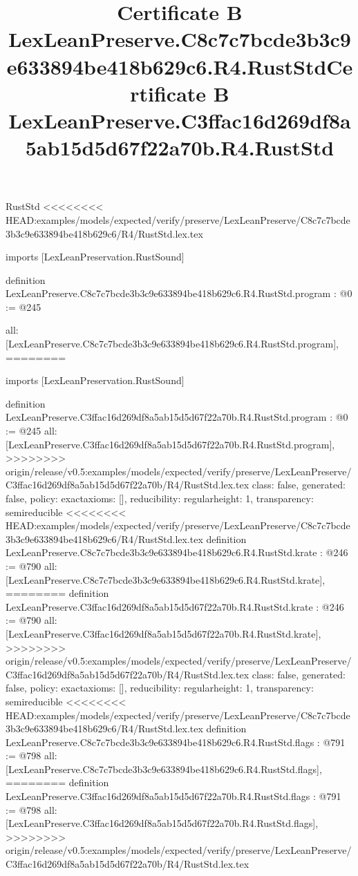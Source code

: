 \begin{lexlean}{RustStd}
<<<<<<<< HEAD:examples/models/expected/verify/preserve/LexLeanPreserve/C8c7c7bcde3b3c9e633894be418b629c6/R4/RustStd.lex.tex
\title{Certificate B LexLeanPreserve.C8c7c7bcde3b3c9e633894be418b629c6.R4.RustStd}
\begin{coremodule}
imports [LexLeanPreservation.RustSound]

definition LexLeanPreserve.C8c7c7bcde3b3c9e633894be418b629c6.R4.RustStd.program : @0 := @245 {
  all: [LexLeanPreserve.C8c7c7bcde3b3c9e633894be418b629c6.R4.RustStd.program],
========
\title{Certificate B LexLeanPreserve.C3ffac16d269df8a5ab15d5d67f22a70b.R4.RustStd}
\begin{coremodule}
imports [LexLeanPreservation.RustSound]

definition LexLeanPreserve.C3ffac16d269df8a5ab15d5d67f22a70b.R4.RustStd.program : @0 := @245 {
  all: [LexLeanPreserve.C3ffac16d269df8a5ab15d5d67f22a70b.R4.RustStd.program],
>>>>>>>> origin/release/v0.5:examples/models/expected/verify/preserve/LexLeanPreserve/C3ffac16d269df8a5ab15d5d67f22a70b/R4/RustStd.lex.tex
  class: false,
  generated: false,
  policy: exact{axioms: []},
  reducibility: regular{height: 1},
  transparency: semireducible
}
<<<<<<<< HEAD:examples/models/expected/verify/preserve/LexLeanPreserve/C8c7c7bcde3b3c9e633894be418b629c6/R4/RustStd.lex.tex
definition LexLeanPreserve.C8c7c7bcde3b3c9e633894be418b629c6.R4.RustStd.krate : @246 := @790 {
  all: [LexLeanPreserve.C8c7c7bcde3b3c9e633894be418b629c6.R4.RustStd.krate],
========
definition LexLeanPreserve.C3ffac16d269df8a5ab15d5d67f22a70b.R4.RustStd.krate : @246 := @790 {
  all: [LexLeanPreserve.C3ffac16d269df8a5ab15d5d67f22a70b.R4.RustStd.krate],
>>>>>>>> origin/release/v0.5:examples/models/expected/verify/preserve/LexLeanPreserve/C3ffac16d269df8a5ab15d5d67f22a70b/R4/RustStd.lex.tex
  class: false,
  generated: false,
  policy: exact{axioms: []},
  reducibility: regular{height: 1},
  transparency: semireducible
}
<<<<<<<< HEAD:examples/models/expected/verify/preserve/LexLeanPreserve/C8c7c7bcde3b3c9e633894be418b629c6/R4/RustStd.lex.tex
definition LexLeanPreserve.C8c7c7bcde3b3c9e633894be418b629c6.R4.RustStd.flags : @791 := @798 {
  all: [LexLeanPreserve.C8c7c7bcde3b3c9e633894be418b629c6.R4.RustStd.flags],
========
definition LexLeanPreserve.C3ffac16d269df8a5ab15d5d67f22a70b.R4.RustStd.flags : @791 := @798 {
  all: [LexLeanPreserve.C3ffac16d269df8a5ab15d5d67f22a70b.R4.RustStd.flags],
>>>>>>>> origin/release/v0.5:examples/models/expected/verify/preserve/LexLeanPreserve/C3ffac16d269df8a5ab15d5d67f22a70b/R4/RustStd.lex.tex
}}}
\end{coremodule}}
\end{coremodule}
\end{lexlean}
